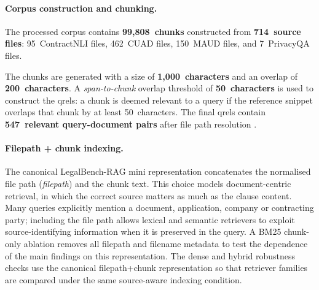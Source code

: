 \documentclass[a4paper,fleqn]{cas-dc}
\begin{document}
\paragraph{Corpus construction and chunking.}
The processed corpus contains \textbf{99,808~chunks} constructed from 
\textbf{714~source files}: 95~ContractNLI files, 
462~CUAD files, 150~MAUD files, and 7~PrivacyQA files.
 
The 
chunks are generated with a size of \textbf{1,000~characters}
and an overlap of \textbf{200~characters}. A 
\textit{span-to-chunk} overlap threshold of \textbf{50~characters} is 
used to construct the qrels: a chunk is deemed relevant 
to a query if the reference snippet overlaps that chunk by at 
least 50~characters. The final qrels contain \textbf{547~relevant 
query-document pairs} after file path resolution
.
\paragraph{Filepath + chunk indexing.}
The canonical LegalBench-RAG mini representation concatenates the
normalised file path (\textit{filepath}) and the chunk text. This
choice models document-centric retrieval, in which the correct
source matters as much as the clause content. Many queries explicitly
mention a document, application, company or contracting party;
including the file path allows lexical and semantic retrievers to
exploit source-identifying information when it is preserved in the
query. A BM25 chunk-only ablation removes all filepath and filename
metadata to test the dependence of the main findings on this
representation. The dense and hybrid robustness checks use the
canonical filepath+chunk representation so that retriever families
are compared under the same source-aware indexing condition.
\end{document}
